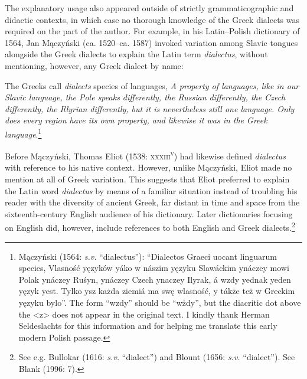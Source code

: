 \begin{styleStandard}
The explanatory usage also appeared outside of strictly grammaticographic and didactic contexts, in which case no thorough knowledge of the Greek dialects was required on the part of the author. For example, in his Latin–Polish dictionary of 1564, Jan Mączyński (ca. 1520–ca. 1587) invoked variation among Slavic tongues alongside the Greek dialects to explain the Latin term \textit{dialectus}\textsc{, }without mentioning, however, any Greek dialect by name:
\end{styleStandard}

\begin{styleQuote}
The Greeks call \textit{dialects} species of languages, \textit{A property of languages, like in our Slavic language, the Pole speaks differently, the Russian differently, the Czech differently, the Illyrian differently, but it is nevertheless still one language. Only does every region have its own property, and likewise it was in the Greek language}.\footnote{ Mączyński (1564: \textit{s.v.} “dialectus”): “Dialectos Graeci uocant linguarum species, Vlasność yęzyków yáko w nászim yęzyku Slawáckim ynáczey mowi Polak ynáczey Ruśyn, ynáczey Czech ynaczey Ilyrak, á wzdy yednak yeden yęzyk yest. Tylko ysz każda ziemiá ma swę wlasność, y tákże też w Greckim yęzyku bylo”. The form “wzdy” should be “wżdy”, but the diacritic dot above the {\textless}z{\textgreater} does not appear in the original text. I kindly thank Herman Seldeslachts for this information and for helping me translate this early modern Polish passage.}
\end{styleQuote}

\begin{styleStandard}
Before Mączyński, Thomas Eliot (1538: \textsc{xxxiii}\textsc{\textsuperscript{v}}) had likewise defined \textit{dialectus} with reference to his native context. However, unlike Mączyński, Eliot made no mention at all of Greek variation. This suggests that Eliot preferred to explain the Latin word \textit{dialectus} by means of a familiar situation instead of troubling his reader with the diversity of ancient Greek, far distant in time and space from the sixteenth-century English audience of his dictionary. Later dictionaries focusing on English did, however, include references to both English and Greek dialects.\footnote{ See e.g. Bullokar (1616: \textit{s.v.} “dialect”) and Blount (1656: \textit{s.v.} “dialect”). See Blank (1996: 7).}
\end{styleStandard}

